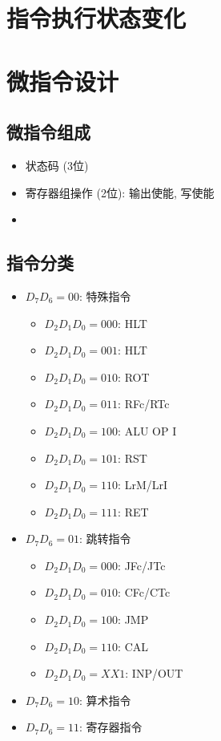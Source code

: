 \documentclass[10pt]{book}
\begin{document}
\section{指令执行状态变化}

\section{微指令设计}
\subsection{微指令组成}
\begin{itemize}
  \item 状态码 (3位)
  \item 寄存器组操作 (2位): 输出使能, 写使能
  \item 
\end{itemize}

\subsection{指令分类}
\begin{itemize}
  \item $D_{7}D_{6}=00$: 特殊指令
  \begin{itemize}
    \item $D_{2}D_{1}D_{0}=000$: HLT
    \item $D_{2}D_{1}D_{0}=001$: HLT
    \item $D_{2}D_{1}D_{0}=010$: ROT
    \item $D_{2}D_{1}D_{0}=011$: RFc/RTc
    \item $D_{2}D_{1}D_{0}=100$: ALU OP I
    \item $D_{2}D_{1}D_{0}=101$: RST
    \item $D_{2}D_{1}D_{0}=110$: LrM/LrI
    \item $D_{2}D_{1}D_{0}=111$: RET
  \end{itemize}
  \item $D_{7}D_{6}=01$: 跳转指令
  \begin{itemize}
    \item $D_{2}D_{1}D_{0}=000$: JFc/JTc
    \item $D_{2}D_{1}D_{0}=010$: CFc/CTc
    \item $D_{2}D_{1}D_{0}=100$: JMP
    \item $D_{2}D_{1}D_{0}=110$: CAL
    \item $D_{2}D_{1}D_{0}=XX1$: INP/OUT
  \end{itemize}
  \item $D_{7}D_{6}=10$: 算术指令
  \item $D_{7}D_{6}=11$: 寄存器指令
\end{itemize}
\end{document}
